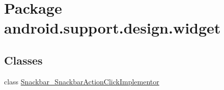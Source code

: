 \hypertarget{namespaceandroid_1_1support_1_1design_1_1widget}{
\section{Package android.support.design.widget}
\label{namespaceandroid_1_1support_1_1design_1_1widget}
}
\subsection*{Classes}
\begin{CompactItemize}
\item 
class \hyperlink{classandroid_1_1support_1_1design_1_1widget_1_1_snackbar___snackbar_action_click_implementor}{Snackbar\_\-SnackbarActionClickImplementor}
\end{CompactItemize}
